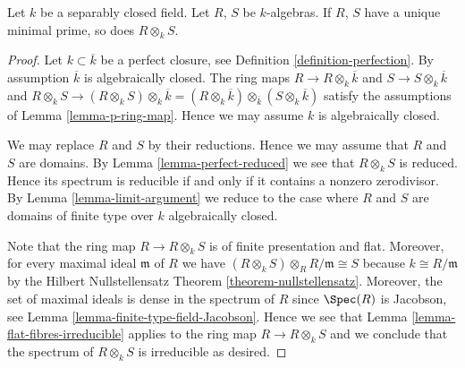 \begin{lemma}
\label{lemma-separably-closed-irreducible}
Let $k$ be a separably closed field.
Let $R$, $S$ be $k$-algebras. If $R$, $S$ have a unique
minimal prime, so does $R \otimes_k S$.
\end{lemma}

\begin{proof}
Let $k \subset \overline{k}$ be a perfect closure, see
Definition \ref{definition-perfection}.
By assumption $\overline{k}$ is algebraically closed.
The ring maps $R \to R \otimes_k \overline{k}$ and
$S \to S \otimes_k \overline{k}$ and
$R \otimes_k S \to (R \otimes_k S) \otimes_k \overline{k}
= (R \otimes_k \overline{k}) \otimes_{\overline{k}} (S \otimes_k \overline{k})$
satisfy the assumptions of Lemma \ref{lemma-p-ring-map}.
Hence we may assume $k$ is algebraically closed.

\medskip\noindent
We may replace $R$ and $S$ by their reductions.
Hence we may assume that $R$ and $S$ are domains.
By Lemma \ref{lemma-perfect-reduced} we see that $R \otimes_k S$ is
reduced. Hence its spectrum is reducible if and only if it contains a nonzero
zerodivisor. By Lemma \ref{lemma-limit-argument} we reduce to the case where
$R$ and $S$ are domains of finite type over $k$ algebraically closed.

\medskip\noindent
Note that the ring map $R \to R \otimes_k S$ is of finite
presentation and flat. Moreover, for every maximal ideal
$\mathfrak m$ of $R$ we have
$(R \otimes_k S) \otimes_R R/\mathfrak m \cong S$ because
$k \cong R/\mathfrak m$ by the Hilbert Nullstellensatz Theorem
\ref{theorem-nullstellensatz}. Moreover, the set of
maximal ideals is dense in the spectrum of $R$ since
$\Spec(R)$ is Jacobson, see Lemma \ref{lemma-finite-type-field-Jacobson}.
Hence we see that Lemma \ref{lemma-flat-fibres-irreducible} applies
to the ring map $R \to R \otimes_k S$ and we conclude that
the spectrum of $R \otimes_k S$ is irreducible as desired.
\end{proof}